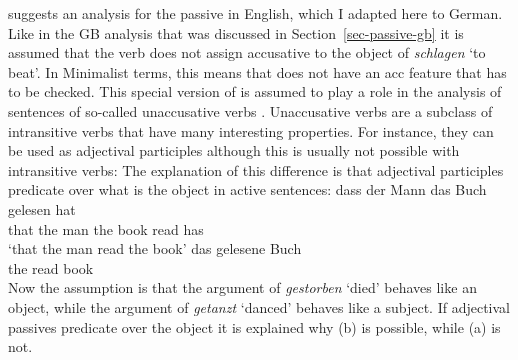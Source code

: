\citet{Adger2003a} suggests an analysis for the passive in English, which I adapted here to
German. Like in the GB analysis that was discussed in Section~\ref{sec-passive-gb} it is assumed
that the verb does not assign accusative to the object of \emph{schlagen} `to beat'. In Minimalist terms, this
means that \littlev does not have an acc feature that has to be checked. This special version of
\littlev is assumed to play a role in the analysis of sentences of so-called unaccusative
verbs \citep{Perlmutter78}. Unaccusative verbs are a subclass of intransitive verbs that have many interesting
properties. For instance, they can be used as adjectival participles although this is usually not
possible with intransitive verbs:
\eal
{}
\zl
The explanation of this difference is that adjectival participles predicate over what is the object
in active sentences:
\eal
\ex
\gll dass der Mann das Buch gelesen hat\\
     that the man  the book read has\\
\glt `that the man read the book'
\ex
\gll das gelesene Buch\\
     the read book\\
\zl
Now the assumption is that the argument of \emph{gestorben} `died' behaves like an object, while the
argument of \emph{getanzt} `danced' behaves like a subject. If adjectival passives predicate over the object
it is explained why (b) is possible, while (a) is not. 

